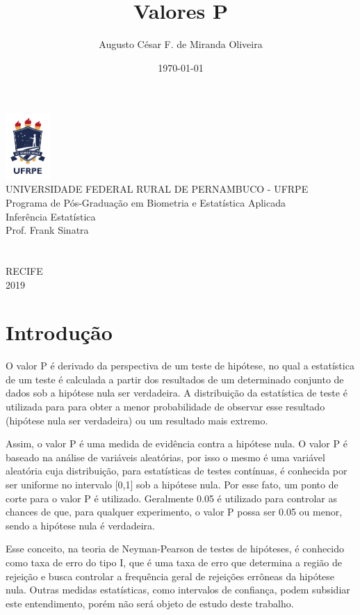 \documentclass[10pt]{article}
\title{Valores P}
\author{Augusto César F. de Miranda Oliveira}
\date{\today}
\theoremstyle{plain}
\theoremstyle{remark}
\theoremstyle{definition}
\begin{document}
\begin{titlepage}
\begin{center}
\includegraphics[height=2.5cm]{logo.png} \\ %
{\large  UNIVERSIDADE FEDERAL RURAL DE PERNAMBUCO - UFRPE\\
Programa de Pós-Graduação em Biometria e Estatística Aplicada\\
Inferência Estatística\\
Prof. Frank Sinatra\\
}
\vspace{5cm} %
\Large{\@title}\\ %
\vspace{5cm}{\@author}\\ %
\vspace{5cm}
RECIFE\\
2019
\end{center}
\end{titlepage}
\section{Introdução}
O valor P é derivado da perspectiva de um teste de hipótese, no qual a estatística de um teste é calculada a partir dos resultados de um determinado conjunto de dados sob a hipótese nula ser verdadeira. A distribuição da estatística de teste é utilizada para para obter a menor probabilidade de observar esse resultado (hipótese nula ser verdadeira) ou um resultado mais extremo.

Assim, o valor P é uma medida de evidência contra a hipótese nula. O valor P é baseado na análise de variáveis aleatórias, por isso o mesmo é uma variável aleatória cuja distribuição, para estatísticas de testes contínuas, é conhecida por ser uniforme no intervalo [0,1] sob a hipótese nula. Por esse fato, um ponto de corte para o valor P é utilizado. Geralmente 0.05 é utilizado para controlar as chances de que, para qualquer experimento, o valor P possa ser 0.05 ou menor, sendo a hipótese nula é verdadeira.

Esse conceito, na teoria de Neyman-Pearson de testes de hipóteses, é conhecido como taxa de erro do tipo I, que é uma taxa de erro que determina a região de rejeição e busca controlar a frequência geral de rejeições errôneas da hipótese nula. Outras medidas estatísticas, como intervalos de confiança, podem subsidiar este entendimento, porém não será objeto de estudo deste trabalho.
\end{document}
